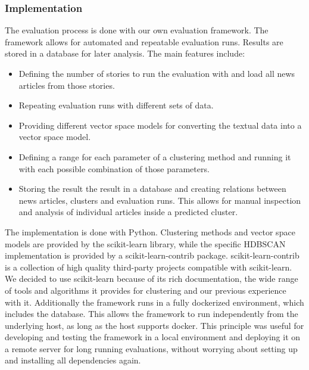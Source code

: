 \subsubsection{Implementation}
\label{subsubsec:4b_implementation}

The evaluation process is done with our own evaluation framework.
The framework allows for automated and repeatable evaluation runs.
Results are stored in a database for later analysis.
The main features include:

\begin{itemize}
    \item Defining the number of stories to run the evaluation with and load all news articles from those stories.
    \item Repeating evaluation runs with different sets of data.
    \item Providing different vector space models for converting the textual data into a vector space model.
    \item Defining a range for each parameter of a clustering method
          and running it with each possible combination of those parameters.
    \item Storing the result the result in a database and creating relations between news articles,
          clusters and evaluation runs.
          This allows for manual inspection and analysis of individual articles inside a predicted cluster.
\end{itemize}

The implementation is done with Python.
Clustering methods and vector space models are provided by the scikit-learn library\cite{scikit-learn},
while the specific HDBSCAN implementation is provided by a scikit-learn-contrib package\cite{McInnes2017}.
scikit-learn-contrib is a collection of high quality third-party projects compatible with scikit-learn.
We decided to use scikit-learn because of its rich documentation,
the wide range of tools and algorithms it provides for clustering and our previous experience with it.
Additionally the framework runs in a fully dockerized environment, which includes the database.
This allows the framework to run independently from the underlying host, as long as the host supports docker.
This principle was useful for developing and testing the framework in a local environment
and deploying it on a remote server for long running evaluations,
without worrying about setting up and installing all dependencies again.


